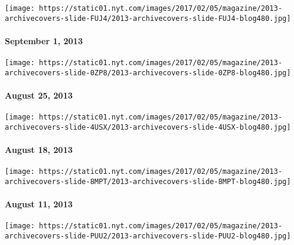 \href{http://www.nytimes.com/indexes/2013/09/01/magazine/index.html}{}

\texttt{[image: https://static01.nyt.com/images/2017/02/05/magazine/2013-archivecovers-slide-FUJ4/2013-archivecovers-slide-FUJ4-blog480.jpg]}

\hypertarget{september-1-2013}{%
\paragraph{September 1, 2013}\label{september-1-2013}}

\href{http://www.nytimes.com/indexes/2013/08/25/magazine/index.html}{}

\texttt{[image: https://static01.nyt.com/images/2017/02/05/magazine/2013-archivecovers-slide-0ZP8/2013-archivecovers-slide-0ZP8-blog480.jpg]}

\hypertarget{august-25-2013}{%
\paragraph{August 25, 2013}\label{august-25-2013}}

\href{http://www.nytimes.com/indexes/2013/08/18/magazine/index.html}{}

\texttt{[image: https://static01.nyt.com/images/2017/02/05/magazine/2013-archivecovers-slide-4USX/2013-archivecovers-slide-4USX-blog480.jpg]}

\hypertarget{august-18-2013}{%
\paragraph{August 18, 2013}\label{august-18-2013}}

\href{http://www.nytimes.com/indexes/2013/08/11/magazine/index.html}{}

\texttt{[image: https://static01.nyt.com/images/2017/02/05/magazine/2013-archivecovers-slide-8MPT/2013-archivecovers-slide-8MPT-blog480.jpg]}

\hypertarget{august-11-2013}{%
\paragraph{August 11, 2013}\label{august-11-2013}}

\href{http://www.nytimes.com/indexes/2013/08/04/magazine/index.html}{}

\texttt{[image: https://static01.nyt.com/images/2017/02/05/magazine/2013-archivecovers-slide-PUU2/2013-archivecovers-slide-PUU2-blog480.jpg]}

